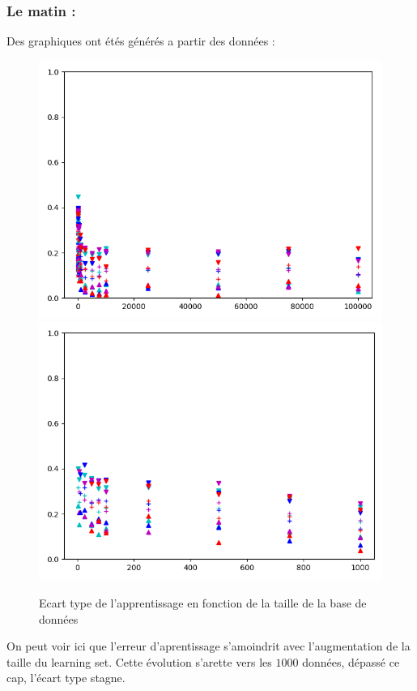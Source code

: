 \subsubsection*{Le matin :}
Des graphiques ont étés générés a partir des données :

\begin{figure}[H]
    \center
    \includegraphics[height=\petit]{sources/data/etfdata/graph3.png}
    \includegraphics[height=\petit]{sources/data/etfdata/graph4.png}
	\caption{Ecart type de l'apprentissage en fonction de la taille de la base de données}
	\label{etfdata2graph}
\end{figure}
\vspace{-5pt}
On peut voir ici que l'erreur d'aprentissage s'amoindrit avec l'augmentation de la taille du learning set.
Cette évolution s'arette vers les $1000$ données, dépassé ce cap, l'écart type stagne.


